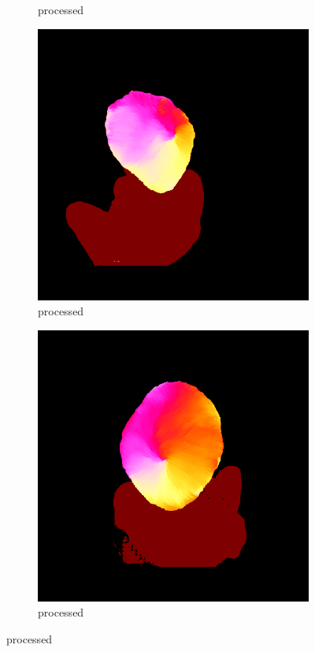 \documentclass[12pt]{article}
\begin{document}
\begin{figure}[h]
\begin{subfigure}{0.3\textwidth}
            \caption{processed}
        \end{subfigure}
        \hfill
        \begin{subfigure}{0.3\textwidth}
            \centering
            \includegraphics[width=\textwidth]{project-milestone/images/strand_map/IMG_0346.png}
            \caption{processed}
        \end{subfigure}
        \hfill
        \begin{subfigure}{0.3\textwidth}
            \centering
            \includegraphics[width=\textwidth]{project-milestone/images/strand_map/IMG_0349.png}
            \caption{processed}
        \end{subfigure}
        

\end{figure}
\end{document}
